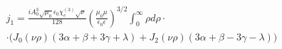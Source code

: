 %
%
%
\begin{equation} \begin{aligned}
j_1 = \frac{i A_0^3 \sqrt{\mu_0} \epsilon_0 \chi_e^{(3)} \sqrt{\nu}}{128}
\left( \frac{\mu_0 \mu}{\epsilon_0 \epsilon} \right)^{3/2}
\int_0^\infty \rho d \rho \cdot \\ \cdot
\Big( J_0 (\nu \rho) ( 3 \alpha + \beta + 3 \gamma + \lambda) + 
J_2 (\nu \rho) ( 3 \alpha + \beta - 3 \gamma - \lambda ) \Big)
\end{aligned} \end{equation}
%
